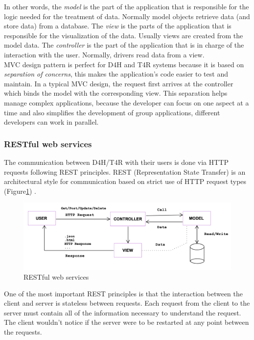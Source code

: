 \documentclass[a4paper, hidelinks, 12pt]{report}
\begin{document}
	In other words, the \textit{model} is the part of the application that is responsible for the logic needed for the treatment of data. Normally model objects retrieve data (and store data) from a database. The \textit{view} is the parts of the application that is responsible for the visualization of the data. Usually views are created from the model data. The \textit{controller} is the part of the application that is in charge of the interaction with the user. Normally, drivers read data from a view. \\
	
	MVC design pattern is perfect for D4H and T4R systems because it is based on \textit{separation of concerns}, this makes the application's code easier to test and maintain. In a typical MVC design, the request first arrives at the controller which binds the model with the corresponding view. This separation helps manage complex applications, because the developer can focus on one aspect at a time and also simplifies the development of group applications, different developers can work in parallel. 
 
	\subsubsection{RESTful web services}
	The communication between D4H/T4R with their users is done via HTTP requests following REST principles. REST (Representation State Transfer) is an architectural style for communication based on strict use of HTTP request types (Figure\ref{fig:RESTful web services}) .\\
	
	\begin{figure}[H]
    		\centering
		\includegraphics[width=1\textwidth]{diagrams/mvc.png}
		\caption[RESTful web services]{RESTful web services}
		\label{fig:RESTful web services}
	\end{figure}
	 
	One of the most important REST principles is that the interaction between the client and server is stateless between requests. Each request from the client to the server must contain all of the information necessary to understand the request. The client wouldn't notice if the server were to be restarted at any point between the requests.\\
	
\end{document}
